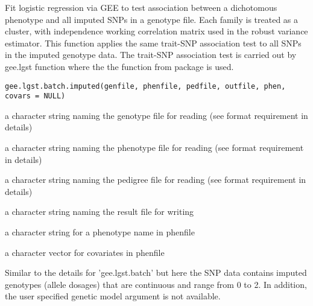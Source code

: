 \begin{Description}\relax
Fit logistic regression via GEE to test association between a dichotomous phenotype 
and all imputed SNPs in a genotype file. Each family is treated as 
a cluster, with independence working correlation matrix used in the robust variance estimator.
This function applies the same trait-SNP association test to all SNPs in the imputed genotype data. 
The trait-SNP association test is carried out by gee.lgst function where the 
the  function from package  is used.
\end{Description}
\begin{Usage}
\begin{verbatim}
gee.lgst.batch.imputed(genfile, phenfile, pedfile, outfile, phen, covars = NULL)
\end{verbatim}
\end{Usage}
\begin{Arguments}
\begin{ldescription}
\item[\code{genfile}] a character string naming the genotype file for reading (see format requirement in details) 
\item[\code{phenfile}] a character string naming the phenotype file for reading (see format requirement in details) 
\item[\code{pedfile}] a character string naming the pedigree file for reading (see format requirement in details) 
\item[\code{outfile}] a character string naming the result file for writing 
\item[\code{phen}] a character string for a phenotype name in phenfile 
\item[\code{covars}] a character vector for covariates in phenfile 
\end{ldescription}
\end{Arguments}
\begin{Details}\relax
Similar to the details for 'gee.lgst.batch' but here the SNP data contains imputed genotypes (allele dosages) 
that are continuous and range from 0 to 2. In addition, the user 
specified genetic model argument is not available.
\end{Details}
